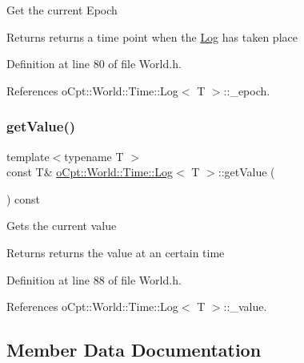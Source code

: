 Get the current Epoch \begin{DoxyReturn}{Returns}
returns a time point when the \hyperlink{classo_cpt_1_1_world_1_1_time_1_1_log}{Log} has taken place 
\end{DoxyReturn}


Definition at line 80 of file World.\+h.



References o\+Cpt\+::\+World\+::\+Time\+::\+Log$<$ T $>$\+::\+\_\+epoch.

\hypertarget{classo_cpt_1_1_world_1_1_time_1_1_log_a6ac8d303676d960e53c3ff2e39811cc3}{}\label{classo_cpt_1_1_world_1_1_time_1_1_log_a6ac8d303676d960e53c3ff2e39811cc3} 
\subsubsection{\texorpdfstring{get\+Value()}{getValue()}}
{\footnotesize\ttfamily template$<$typename T $>$ \\
const T\& \hyperlink{classo_cpt_1_1_world_1_1_time_1_1_log}{o\+Cpt\+::\+World\+::\+Time\+::\+Log}$<$ T $>$\+::get\+Value (\begin{DoxyParamCaption}{ }\end{DoxyParamCaption}) const\hspace{0.3cm}{\ttfamily [inline]}}

Gets the current value \begin{DoxyReturn}{Returns}
returns the value at an certain time 
\end{DoxyReturn}


Definition at line 88 of file World.\+h.



References o\+Cpt\+::\+World\+::\+Time\+::\+Log$<$ T $>$\+::\+\_\+value.



\subsection{Member Data Documentation}
\hypertarget{classo_cpt_1_1_world_1_1_time_1_1_log_a122e3702f277b998131f433829d1b67b}{}\label{classo_cpt_1_1_world_1_1_time_1_1_log_a122e3702f277b998131f433829d1b67b} 
